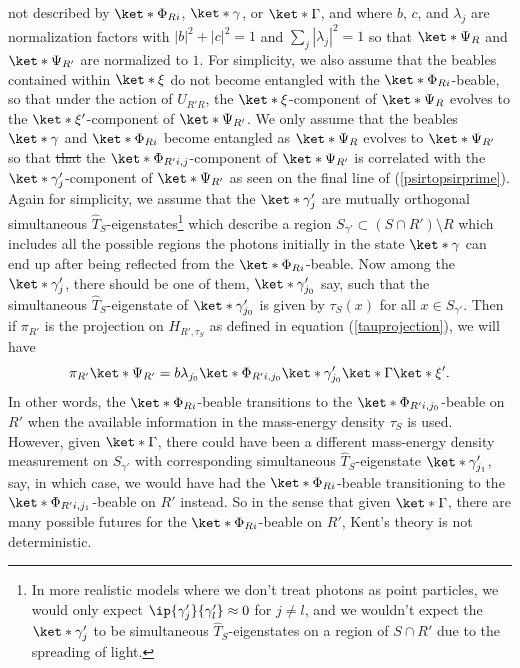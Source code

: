 \documentclass[12pt]{report}
\providecommand{\DIFadd}[1]{{\protect\color{blue}\uwave{#1}}} %
\providecommand{\DIFdel}[1]{{\protect\color{red}\sout{#1}}}                      %
\providecommand{\DIFaddbegin}{} %
\providecommand{\DIFaddend}{} %
\providecommand{\DIFdelbegin}{} %
\providecommand{\DIFdelend}{} %
\begin{document}
not described by $\ket*{\Phi_{Ri}}$, $\ket*{\gamma}$, or $\ket*{\Gamma}$, and where $b$, $c$, and $\lambda_j$ are normalization factors with $|b|^2+|c|^2=1$ and $\sum_j |\lambda_j|^2=1$ so that $\ket*{\Psi_{R}}$ and $\ket*{\Psi_{R'}}$ are normalized to $1$. 
For simplicity, we also assume that the beables contained within $\ket*{\xi}$ do not become entangled with the $\ket*{\Phi_{Ri}}$-beable, so that under the action of $U_{R'R}$, the $\ket*{\xi}$-component of $\ket*{\Psi_{R}}$ evolves to the $\ket*{\xi'}$-component of $\ket*{\Psi_{R'}}$. We only assume that the beables $\ket*{\gamma}$ and $\ket*{\Phi_{Ri}}$ become entangled as $\ket*{\Psi_{R}}$ evolves to $\ket*{\Psi_{R'}}$ so that \DIFdelbegin \DIFdel{that }\DIFdelend the $\ket*{\Phi_{R'i, j}}$-component of $\ket*{\Psi_{R'}}$ is correlated with the $\ket*{\gamma_{j}'}$-component of $\ket*{\Psi_{R'}}$ as seen on the final line of (\ref{psirtopsirprime}). Again for simplicity, we assume that the $\ket*{\gamma_{j}'}$ are mutually orthogonal simultaneous $\hat{T}_S$-eigenstates\footnote{In more realistic models where we don't treat photons as point particles, we would only expect $\ip{\gamma_{j}'}{\gamma_{l}'}\approx 0$ for $j\neq l$, and we wouldn't expect the $\ket*{\gamma_{j}'}$ to be simultaneous $\hat{T}_S$-eigenstates on a region of $S\cap R'$  due to the spreading of light.} which  describe a region  $S_{\gamma'}\subset(S\cap R')\setminus R$ which includes all the possible regions the photons initially in the state $\ket*{\gamma}$ can end up \DIFaddbegin \DIFadd{in }\DIFaddend after being reflected from the $\ket*{\Phi_{Ri}}$-beable. Now among the $\ket*{\gamma_{j}'}$, there should be one of them, $\ket*{\gamma_{j_0}'}$ say, such that the simultaneous $\hat{T}_S$-eigenstate of $\ket*{\gamma_{j_0}'}$ is given by $\tau_S(x)$ for all $x\in S_{\gamma'}$. Then if $\pi_{R'}$ is the projection on $H_{R',\tau_S}$ as defined in equation (\ref{tauprojection}), we will have 
$$\pi_{R'}\ket*{\Psi_{R'}}=b\lambda_{j_0}\ket*{\Phi_{R'i,j_0}}\ket*{\gamma_{j_0}'}\ket*{\Gamma}\ket*{\xi'}.$$
In other words, the $\ket*{\Phi_{Ri}}$-beable transitions to the $\ket*{\Phi_{R'i,j_0}}$-beable on $R'$ when the available information in the mass-energy density $\tau_S$ is used. However, given $\ket*{\Gamma}$, there could have been a different mass-energy density measurement on $S_{\gamma'}$ with corresponding simultaneous $\hat{T}_S$-eigenstate $\ket*{\gamma_{j_1}'}$, say, in which case, we would have had the $\ket*{\Phi_{Ri}}$-beable transitioning to the $\ket*{\Phi_{R'i,j_1}}$-beable on $R'$ instead.
So in the sense that given $\ket*{\Gamma}$, there are many possible futures for the $\ket*{\Phi_{Ri}}$-beable on $R'$,  Kent's theory is not deterministic.
\end{document}
